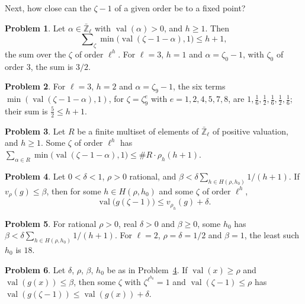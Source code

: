 \documentclass[reqno]{amsart}
\theoremstyle{definition}
\newtheorem{problem}{Problem}[section]
\theoremstyle{plain}
\newcommand{\Zl}{\bar{\mathbb{Z}}_\ell}
\newcommand{\val}{\operatorname{val}}
\begin{document}
Next, how close can the \(\zeta - 1\) of a given order be to a fixed point?

\begin{problem}\label{pr:close-to-few}
Let \(\alpha \in \Zl\) with \(\val(\alpha) > 0\), and \(h \ge 1\).  Then
\[
  \sum\nolimits_{\zeta} \min\bigl(\val(\zeta - 1 - \alpha), 1\bigr) \le h + 1,
\]
the sum over the \(\zeta\) of order \(\ell^h\).  For \(\ell = 3\), \(h = 1\) and \(\alpha = \zeta_0 - 1\), with \(\zeta_0\) of order \(3\), the sum is \(3/2\).
\end{problem}

\begin{problem}\label{pr:ninth}
For \(\ell = 3\), \(h = 2\) and \(\alpha = \zeta_9 - 1\), the six terms \(\min(\val(\zeta - 1 - \alpha), 1)\), for \(\zeta = \zeta_9^e\) with \(e = 1, 2, 4, 5, 7, 8\), are \(1, \tfrac16, \tfrac12, \tfrac16, \tfrac12, \tfrac16\); their sum is \(\tfrac52 \le h + 1\).
\end{problem}

\begin{problem}\label{pr:average}
Let \(R\) be a finite multiset of elements of \(\Zl\) of positive valuation, and \(h \ge 1\).  Some \(\zeta\) of order \(\ell^h\) has \(\sum_{\alpha \in R} \min\bigl(\val(\zeta - 1 - \alpha), 1\bigr) \le \#R \cdot \rho_h (h + 1)\).
\end{problem}

\begin{problem}\label{pr:one-variable}
Let \(0 < \delta < 1\), \(\rho > 0\) rational, and \(\beta < \delta\sum_{h \in H(\rho, h_0)} 1/(h + 1)\).  If \(v_\rho(g) \le \beta\), then for some \(h \in H(\rho, h_0)\) and some \(\zeta\) of order \(\ell^h\),
\[
  \val\bigl(g(\zeta - 1)\bigr) \le v_{\rho_h}(g) + \delta .
\]
\end{problem}

\begin{problem}\label{pr:harmonic}
For rational \(\rho > 0\), real \(\delta > 0\) and \(\beta \ge 0\), some \(h_0\) has \(\beta < \delta\sum_{h \in H(\rho, h_0)} 1/(h + 1)\).  For \(\ell = 2\), \(\rho = \delta = 1/2\) and \(\beta = 1\), the least such \(h_0\) is \(18\).
\end{problem}

\begin{problem}\label{pr:one-var-point}
Let \(\delta\), \(\rho\), \(\beta\), \(h_0\) be as in Problem~\ref{pr:one-variable}.  If \(\val(x) \ge \rho\) and \(\val(g(x)) \le \beta\), then some \(\zeta\) with \(\zeta^{\ell^{h_0}} = 1\) and \(\val(\zeta - 1) \le \rho\) has \(\val(g(\zeta - 1)) \le \val(g(x)) + \delta\).
\end{problem}
\end{document}
